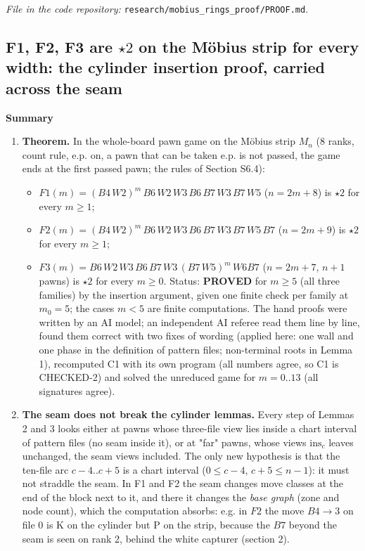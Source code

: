 \noindent\emph{File in the code repository:} \texttt{research/mobius\_rings\_proof/PROOF.md}.\par


\subsection*{F1, F2, F3 are $\star2$ on the Möbius strip for every width: the cylinder insertion proof, carried across the seam}
\textbf{Summary}

\begin{enumerate}
\item \textbf{Theorem.} In the whole-board pawn game on the Möbius strip $M_n$ (8 ranks, count rule, e.p. on, a pawn that can be taken e.p. is not passed, the game ends at the first passed pawn; the rules of Section S6.4):
\begin{itemize}
\item $F1(m)=(B4\,W2)^m\,B6\,W2\,W3\,B6\,B7\,W3\,B7\,W5$ ($n=2m+8$) is $\star2$ for every $m\ge1$;
\item $F2(m)=(B4\,W2)^m\,B6\,W2\,W3\,B6\,B7\,W3\,B7\,W5\,B7$ ($n=2m+9$) is $\star2$ for every $m\ge1$;
\item $F3(m)=B6\,W2\,W3\,B6\,B7\,W3\,(B7\,W5)^m\,W6B7$ ($n=2m+7$, $n+1$ pawns) is $\star2$ for every $m\ge0$.
Status: \textbf{PROVED} for $m\ge5$ (all three families) by the insertion argument, given one finite check per family at $m_0=5$; the cases $m<5$ are finite computations. The hand proofs were written by an AI model; an independent AI referee read them line by line, found them correct with two fixes of wording (applied here: one wall and one phase in the definition of pattern files; non-terminal roots in Lemma 1), recomputed C1 with its own program (all numbers agree, so C1 is CHECKED-2) and solved the unreduced game for $m=0..13$ (all signatures agree).
\end{itemize}
\item \textbf{The seam does not break the cylinder lemmas.} Every step of Lemmas 2 and 3 looks either at pawns whose three-file view lies inside a chart interval of pattern files (no seam inside it), or at "far" pawns, whose views $\mathrm{ins}_c$ leaves unchanged, the seam views included. The only new hypothesis is that the ten-file arc $c-4..c+5$ is a chart interval ($0\le c-4$, $c+5\le n-1$): it must not straddle the seam. In F1 and F2 the seam changes move classes at the end of the block next to it, and there it changes the \emph{base graph} (zone and node count), which the computation absorbs: e.g. in $F2$ the move $B4\to3$ on file 0 is K on the cylinder but P on the strip, because the $B7$ beyond the seam is seen on rank 2, behind the white capturer (section 2).

\end{enumerate}
